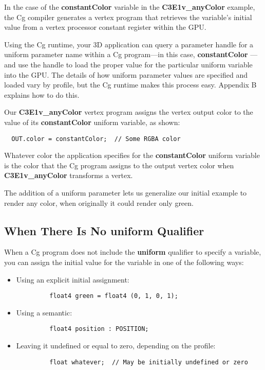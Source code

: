 \documentclass[../main.tex]{subfiles}
\begin{document}
In the case of the \textbf{constantColor} variable in the \textbf{C3E1v_anyColor} example, the Cg compiler generates a vertex program that retrieves the variable's initial value from a vertex processor constant register within the GPU.

Using the Cg runtime, your 3D application can query a parameter handle for a uniform parameter name within a Cg program—in this case, \textbf{constantColor} —and use the handle to load the proper value for the particular uniform variable into the GPU. The details of how uniform parameter values are specified and loaded vary by profile, but the Cg runtime makes this process easy. Appendix B explains how to do this.

Our \textbf{C3E1v_anyColor} vertex program assigns the vertex output color to the value of its \textbf{constantColor} uniform variable, as shown:

\FloatBarrier
\begin{lstlisting}
  OUT.color = constantColor;  // Some RGBA color
\end{lstlisting}
\FloatBarrier

Whatever color the application specifies for the \textbf{constantColor} uniform variable is the color that the Cg program assigns to the output vertex color when \textbf{C3E1v_anyColor} transforms a vertex.

The addition of a uniform parameter lets us generalize our initial example to render any color, when originally it could render only green.

\subsection*{When There Is No uniform Qualifier}

When a Cg program does not include the \textbf{uniform} qualifier to specify a variable, you can assign the initial value for the variable in one of the following ways:

\FloatBarrier
\begin{itemize}
\item Using an explicit initial assignment:
\FloatBarrier
\begin{lstlisting}
         float4 green = float4 (0, 1, 0, 1);
\end{lstlisting}
\FloatBarrier

\item Using a semantic:
\FloatBarrier
\begin{lstlisting}
         float4 position : POSITION;
\end{lstlisting}
\FloatBarrier

\item Leaving it undefined or equal to zero, depending on the profile:
\FloatBarrier
\begin{lstlisting}
         float whatever;  // May be initially undefined or zero
\end{lstlisting}
\FloatBarrier
\end{itemize}
\FloatBarrier
\end{document}
